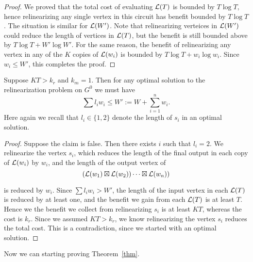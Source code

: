 \documentclass[11pt]{article} %
\theoremstyle{plain}
\theoremstyle{definition}
\begin{document}
\begin{proof}
We proved that the total cost of evaluating $\mathcal{L}(T)$ is bounded by $T\log T$, hence relinearizing any single vertex in this circuit has benefit bounded by $T\log T$. The situation is similar for $\mathcal{L}(W')$. Note that relinearizing verteices in $\mathcal{L}(W')$ 
could reduce the length of vertices in $\mathcal{L}(T)$, but the benefit is still bounded above by $T\log T + W'\log W'$. For the same reason, the benefit of relinearizing any vertex in any of the $K$ copies of $\mathcal{L}(w_i)$ is bounded by $T\log T + w_i \log w_i$. Since $w_i \leq W'$, this completes
the proof.
\end{proof}


\begin{lemma} \label{lem: constraint}
Suppose $KT > k_r$ and $k_m =1$.  Then for any optimal solution to the relinearization problem on $G^0$ we must have 
\[
	\sum l_i w_i \leq  W':= W + \sum_{i =1}^n w_i. 
\]
Here again we recall that $l_i \in \{1, 2 \}$ denote the length of $s_i$ in an optimal solution. 
\end{lemma}



\begin{proof}
Suppose the claim is false. Then there exists $i$ such that $l_i = 2$. We relinearize the vertex $s_i$, which reduces the length of the final output in each  copy of $\mathcal{L}(w_i)$ by $w_i$, and the length of the output vertex of
$$
(\mathcal{L}(w_1) \boxtimes \mathcal{L}(w_2)) \cdots \boxtimes \mathcal{L}(w_n))$$

is reduced by $w_i$. Since $\sum l_i w_i > W'$, the length of the input vertex in each $\mathcal{L}(T)$ is reduced by at least one, and the benefit we gain from each $\mathcal{L}(T)$ is at least $T$. Hence we the benefit 
we collect from relinearizing $s_i$ is at least $KT$, whereas the cost is $k_r$. Since we assumed $KT > k_r$, we know relinearizing the vertex $s_i$ reduces  the total cost. This is a contradiction, since we started with an optimal solution. 
\end{proof}


Now we can starting proving Theorem~\ref{thm}. 
\end{document}
